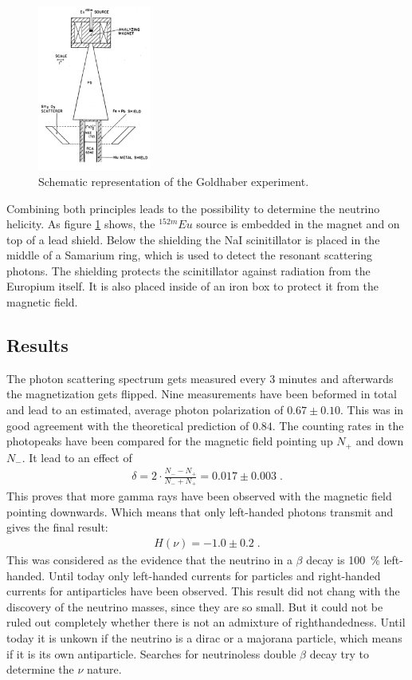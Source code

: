 \begin{figure}
    \includegraphics[width=0.33\textwidth]{graphics/gold.png}
    \caption{Schematic representation of the Goldhaber experiment.\cite{gold}}
		\label{fig:gold}
  \end{figure}
  \FloatBarrier

Combining both principles leads to the possibility to determine the neutrino helicity. As figure \ref{fig:gold} shows, the $^{152m}Eu$ source is embedded in the magnet and on top of a lead shield. Below the shielding the NaI scinitillator is placed in the middle of a Samarium ring, which is used to detect the resonant scattering photons. The shielding protects the scinitillator against radiation from the Europium itself. It is also placed inside of an iron box to protect it from the magnetic field.
\subsection{Results}
The photon scattering spectrum gets measured every $3$ minutes and afterwards the magnetization gets flipped. Nine measurements have been beformed in total and lead to an estimated, average photon polarization of $0.67 \pm 0.10$. This was in good agreement with the theoretical prediction of $0.84$. The counting rates in the photopeaks have been compared for the magnetic field pointing up $N_+$ and down $N_-$. It lead to an effect of
\begin{align*}
	\delta = 2 \cdot \frac{N_- - N_+}{N_- + N_+} = 0.017 \pm 0.003\;.
\end{align*}
This proves that more gamma rays have been observed with the magnetic field pointing downwards. Which means that only left-handed photons transmit and gives the final result:
\begin{align*}
	H(\nu) = -1.0 \pm 0.2 \; .
\end{align*}
This was considered as the evidence that the neutrino in a $\beta$ decay is \SI{100}{\percent} left-handed. Until today only left-handed currents for particles and right-handed currents for antiparticles have been observed. This result did not chang with the discovery of the neutrino masses, since they are so small. But it could not be ruled out completely whether there is not an admixture of righthandedness. Until today it is unkown if the neutrino is a dirac or a majorana particle, which means if it is its own antiparticle. Searches for neutrinoless double $\beta$ decay try to determine the $\nu$ nature.
